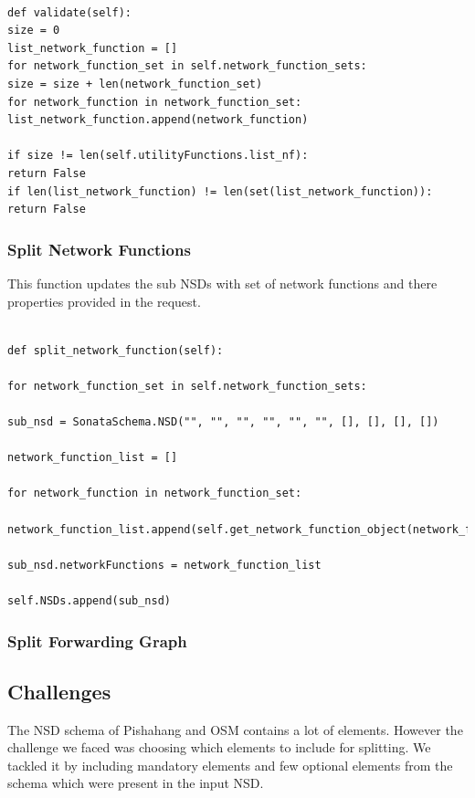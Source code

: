 \begin{lstlisting}[caption=Splitting Request Validation, label=lis:validation]

def validate(self):
size = 0
list_network_function = []
for network_function_set in self.network_function_sets:
size = size + len(network_function_set)
for network_function in network_function_set:
list_network_function.append(network_function)

if size != len(self.utilityFunctions.list_nf):
return False
if len(list_network_function) != len(set(list_network_function)):
return False

\end{lstlisting}

\subsubsection{Split Network Functions}
This function updates the sub NSDs with set of network functions and there properties provided in the request.

\begin{lstlisting}[caption=Network Function Splitting, label=lis:NFSplitting]

def split_network_function(self):

for network_function_set in self.network_function_sets:

sub_nsd = SonataSchema.NSD("", "", "", "", "", "", [], [], [], [])

network_function_list = []

for network_function in network_function_set:

network_function_list.append(self.get_network_function_object(network_function))

sub_nsd.networkFunctions = network_function_list

self.NSDs.append(sub_nsd)

\end{lstlisting}

\subsubsection{Split Forwarding Graph}

\subsection{Challenges}
The NSD schema of Pishahang and OSM contains a lot of elements. However the challenge we faced was choosing which elements to include for splitting. We tackled it by including mandatory elements and few optional elements from the schema which were present in the input NSD.
